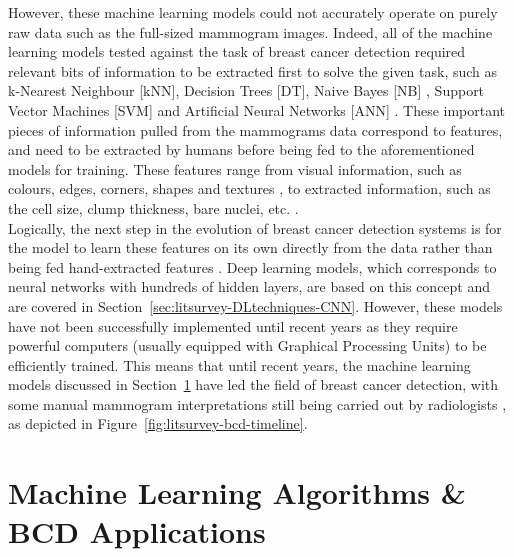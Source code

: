 However, these machine learning models could not accurately operate on purely raw data such as the full-sized mammogram images. Indeed, all of the machine learning models tested against the task of breast cancer detection required relevant bits of information to be extracted first to solve the given task, such as k-Nearest Neighbour [kNN], Decision Trees [DT], Naive Bayes [NB] \cite{Asri2016}, Support Vector Machines [SVM] \cite{Ramos-Pollan2012} and Artificial Neural Networks [ANN] \cite{Yue2018}. These important pieces of information pulled from the mammograms data correspond to features, and need to be extracted by humans before being fed to the aforementioned models for training. These features range from visual information, such as colours, edges, corners, shapes and textures \cite{Geron2019}, to extracted information, such as the cell size, clump thickness, bare  nuclei, etc. \cite{Yue2018}.\\

Logically, the next step in the evolution of breast cancer detection systems is for the model to learn these features on its own directly from the data rather than being fed hand-extracted features \cite{Yala2019}. Deep learning models, which corresponds to neural networks with hundreds of hidden layers, are based on this concept and are covered in Section~\ref{sec:litsurvey-DLtechniques-CNN}. However, these models have not been successfully implemented until recent years as they require powerful computers (usually equipped with Graphical Processing Units) to be efficiently trained. This means that until recent years, the machine learning models discussed in Section~\ref{sec:litreview-MLmodel-BCDapplications} have led the field of breast cancer detection, with some manual mammogram interpretations still being carried out by radiologists \cite{Litjens2017}, as depicted in Figure~\ref{fig:litsurvey-bcd-timeline}.



\section{Machine Learning Algorithms \& BCD Applications}
\label{sec:litreview-MLmodel-BCDapplications}

